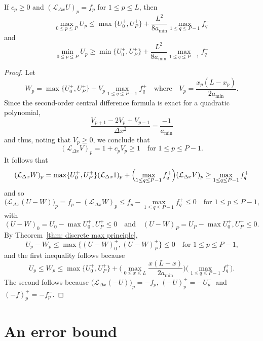 \begin{theorem}
If $c_p\ge0$ and $(\mathcal{L}_{\Delta x}U)_p=f_p$ for $1\le p\le L$, then
\[
\max_{0\le p\le P}U_p\le\max\{U^+_0,U^+_P\}+\frac{L^2}{8a_{\min}}
	\max_{1\le q\le P-1}f_q^+
\]
and
\[
\min_{0\le p\le P}U_p\ge\min\{U^+_0,U^+_P\}+\frac{L^2}{8a_{\min}}
	\max_{1\le q\le P-1}f_q^-
\]
\end{theorem}
\begin{proof}
Let 
\[
W_p=\max\{U^+_0,U^+_P\}+V_p\max_{1\le q\le P-1}f_q^+
\quad\text{where}\quad
V_p=\frac{x_p(L-x_p)}{2a_{\min}}.
\]
Since the second-order central difference formula is exact for a quadratic 
polynomial,
\[
\frac{V_{p+1}-2V_p+V_{p-1}}{\Delta x^2}=\frac{-1}{a_{\min}}
\]
and thus, noting that $V_p\ge0$, we conclude that
\[
(\mathcal{L}_{\Delta x}V)_p=1+c_pV_p\ge1\quad\text{for $1\le p\le P-1$.}
\]
It follows that
\[
(\mathcal{L}_{\Delta x}W)_p=\max\{U^+_0,U^+_P\}(\mathcal{L}_{\Delta x}1)_p
	+\Bigl(\max_{1\le q\le P-1}f_q^+\Bigr)(\mathcal{L}_{\Delta x}V)_p
	\ge\max_{1\le q\le P-1}f_q^+
\]
and so
\[
\bigl(\mathcal{L}_{\Delta x}(U-W)\bigr)_p=f_p-(\mathcal{L}_{\Delta x}W)_p
	\le f_p-\max_{1\le q\le P-1}f_q^+\le0\quad\text{for $1\le p\le P-1$,}
\]
with
\[
(U-W)_0=U_0-\max{U_0^+,U_P^+}\le0
\quad\text{and}\quad
(U-W)_P=U_P-\max{U_0^+,U_P^+}\le0.
\]
By Theorem~\ref{thm: discrete max principle},
\[
U_p-W_p\le\max\{(U-W)_0^+,(U-W)_P^+\}\le0\quad\text{for $1\le p\le P-1$,}
\]
and the first inequality follows because
\[
U_p\le W_p\le\max\{U^+_0,U^+_P\}
	+\biggl(\max_{0\le x\le L}\frac{x(L-x)}{2a_{\min}}\biggr)
	\biggl(\max_{1\le q\le P-1}f_q^+\biggr). 
\]
The second follows because $\bigl(\mathcal{L}_{\Delta x}(-U)\bigr)_p=-f_p$,
$(-U)_p^+=-U_p^-$~and $(-f)_p^+=-f_p^-$.
\end{proof}





\section{An error bound}
